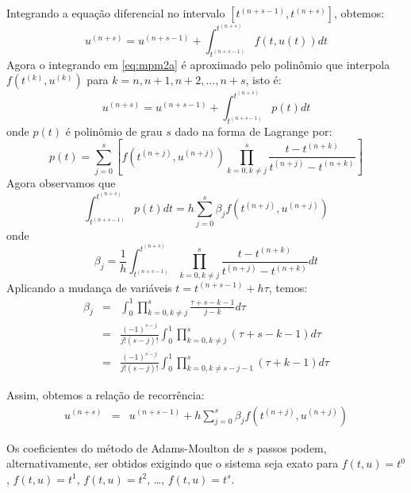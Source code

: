 Integrando a equação diferencial no intervalo $[t^{(n+s-1)},t^{(n+s)}]$, obtemos:
\begin{equation}\label{eq:mpm2a}
  u^{(n+s)}  = u^{(n+s-1)}  + \int_{t^{(n+s-1)}}^{t^{(n+s)}} f(t,u(t)) dt
\end{equation}
 Agora o integrando em \eqref{eq:mpm2a} é aproximado pelo polinômio que interpola $f(t^{(k)},u^{(k)})$ para $k = n, n+1, n+2, \ldots, n+s$, isto é:
\begin{equation}\label{eq:mpm2b}
  u^{(n+s)} = u^{(n+s-1)}  + \int_{t^{(n+s-1)}}^{t^{(n+s)}} p(t) dt
\end{equation}
onde $p(t)$ é polinômio de grau $s$ dado na forma de Lagrange por:
\begin{equation} p(t)=\sum_{j=0}^{s}\left[f(t^{(n+j)},u^{(n+j)}) \prod_{k=0,k\neq j}^{s} \frac{t-t^{(n+k)}}{t^{(n+j)}-t^{(n+k)}}\right] \end{equation}
Agora observamos que
\begin{equation} \int _{t^{(n+s-1)}}^{t^{(n+s)}} p(t) dt=h\sum_{j=0}^{s}\beta_j f(t^{(n+j)},u^{(n+j)}) \end{equation}
onde
\begin{equation}
\beta_j= \frac{1}{h}\int_{t^{(n+s-1)}}^{t^{(n+s)}} \prod_{k=0,k\neq j}^{s} \frac{t-t^{(n+k)}}{t^{(n+j)}-t^{(n+k)}}dt
\end{equation}
Aplicando a mudança de variáveis $t=t^{(n+s-1)}+h\tau$, temos:
\begin{eqnarray}\label{eq:betaj_m}
\beta_j&=& \int_0^1 \prod_{k=0,k\neq j}^{s} \frac{\tau+s-k-1}{j-k}d\tau\\
&=& \frac{(-1)^{s-j}}{j!(s-j)!}\int_{0}^{1} \prod_{k=0,k\neq j}^{s}(\tau+s-k-1)d\tau\\
&=& \frac{(-1)^{s-j}}{j!(s-j)!}\int_{0}^{1} \prod_{k=0,k\neq s-j-1}^{s}(\tau+k-1)d\tau
\end{eqnarray}

Assim, obtemos a relação de recorrência:
\begin{eqnarray}\label{eq:mam}
  u^{(n+s)}  &=& u^{(n+s-1)}  + h\sum_{j=0}^{s}\beta_j f(t^{(n+j)},u^{(n+j)})
\end{eqnarray}


\begin{obs} Os coeficientes do método de Adams-Moulton de $s$ passos podem, alternativamente, ser obtidos exigindo que o sistema seja exato para $f(t,u)=t^0$, $f(t,u)=t^1$, $f(t,u)=t^2$, \ldots, $f(t,u)=t^{s}$.

\end{obs}

